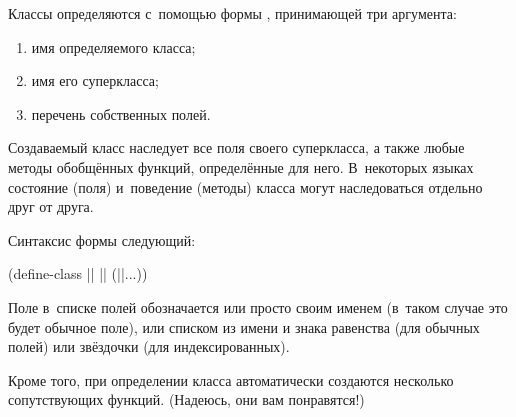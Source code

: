 Классы определяются с~помощью формы , принимающей три
аргумента:

\begin{enumerate}
  \item имя определяемого класса;
  \item имя его суперкласса;
  \item перечень собственных полей.
\end{enumerate}

Создаваемый класс наследует все поля своего суперкласса, а также любые методы
обобщённых функций, определённые для него. В~некоторых языках состояние (поля)
и~поведение (методы) класса могут наследоваться отдельно друг от друга.

Синтаксис формы  следующий:

\begin{code:lisp}
(define-class || || (||...))
\end{code:lisp}

Поле в~списке полей обозначается или просто своим именем (в~таком случае это
будет обычное поле), или списком из имени и знака равенства (для обычных полей)
или звёздочки (для индексированных).

Кроме того, при определении класса автоматически создаются несколько
сопутствующих функций. (Надеюсь, они вам понравятся!)

